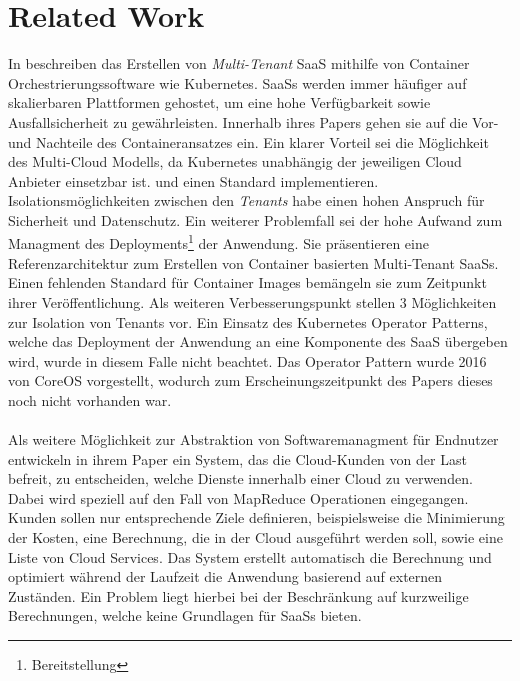 \section{Related Work}
In \cite{Truyen2016} beschreiben \citeauthor{Truyen2016}
das Erstellen von \emph{Multi-Tenant}
\acf{SaaS} mithilfe von Container Orchestrierungssoftware wie Kubernetes.
\acp{SaaS} werden immer häufiger auf skalierbaren Plattformen gehostet, um eine hohe Verfügbarkeit sowie Ausfallsicherheit zu gewährleisten.
Innerhalb ihres Papers gehen sie auf die Vor- und Nachteile des Containeransatzes ein.
Ein klarer Vorteil sei die Möglichkeit des Multi-Cloud Modells, da Kubernetes unabhängig der jeweiligen Cloud Anbieter einsetzbar ist.
und einen Standard implementieren.
Isolationsmöglichkeiten zwischen den \emph{Tenants} habe einen hohen Anspruch für Sicherheit und Datenschutz.
Ein weiterer Problemfall sei der hohe Aufwand zum Managment des Deployments\footnote{Bereitstellung} der Anwendung.
Sie präsentieren eine Referenzarchitektur zum Erstellen von Container basierten Multi-Tenant SaaSs.
Einen fehlenden Standard für Container Images bemängeln sie zum Zeitpunkt ihrer Veröffentlichung.
Als weiteren Verbesserungspunkt stellen \citeauthor{Truyen2016} 3 Möglichkeiten zur Isolation von Tenants vor.
Ein Einsatz des Kubernetes Operator Patterns, welche das Deployment der Anwendung an eine Komponente des \acf{SaaS} übergeben wird,
wurde in diesem Falle nicht beachtet. Das Operator Pattern wurde 2016 von CoreOS vorgestellt, wodurch zum Erscheinungszeitpunkt
des Papers dieses noch nicht vorhanden war.

\paragraph{}
Als weitere Möglichkeit zur Abstraktion von Softwaremanagment für Endnutzer entwickeln \citeauthor{Wieder2012} in ihrem Paper
\cite{Wieder2012} ein System, das die Cloud-Kunden von der Last befreit, zu entscheiden, welche Dienste innerhalb einer Cloud zu verwenden.
Dabei wird speziell auf den Fall von MapReduce Operationen eingegangen. Kunden sollen nur entsprechende Ziele definieren, beispielsweise
die Minimierung der Kosten, eine Berechnung, die in der Cloud ausgeführt werden soll, sowie eine Liste von Cloud Services.
Das System erstellt automatisch die Berechnung und optimiert während der Laufzeit die Anwendung basierend auf externen Zuständen.
Ein Problem liegt hierbei bei der Beschränkung auf kurzweilige Berechnungen, welche keine Grundlagen für \acp{SaaS} bieten.

